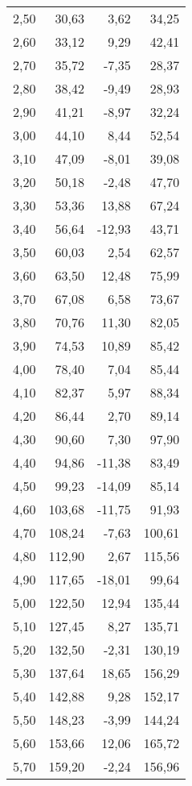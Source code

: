 \documentclass{article}
\begin{document}
\begin{center}
\begin{longtable}{r|r|r|r}
        2,50 & 30,63 & 3,62 & 34,25 \\
        2,60 & 33,12 & 9,29 & 42,41 \\
        2,70 & 35,72 & -7,35 & 28,37 \\
        2,80 & 38,42 & -9,49 & 28,93 \\
        2,90 & 41,21 & -8,97 & 32,24 \\
        3,00 & 44,10 & 8,44 & 52,54 \\
        3,10 & 47,09 & -8,01 & 39,08 \\
        3,20 & 50,18 & -2,48 & 47,70 \\
        3,30 & 53,36 & 13,88 & 67,24 \\
        3,40 & 56,64 & -12,93 & 43,71 \\
        3,50 & 60,03 & 2,54 & 62,57 \\
        3,60 & 63,50 & 12,48 & 75,99 \\
        3,70 & 67,08 & 6,58 & 73,67 \\
        3,80 & 70,76 & 11,30 & 82,05 \\
        3,90 & 74,53 & 10,89 & 85,42 \\
        4,00 & 78,40 & 7,04 & 85,44 \\
        4,10 & 82,37 & 5,97 & 88,34 \\
        4,20 & 86,44 & 2,70 & 89,14 \\
        4,30 & 90,60 & 7,30 & 97,90 \\
        4,40 & 94,86 & -11,38 & 83,49 \\
        4,50 & 99,23 & -14,09 & 85,14 \\
        4,60 & 103,68 & -11,75 & 91,93 \\
        4,70 & 108,24 & -7,63 & 100,61 \\
        4,80 & 112,90 & 2,67 & 115,56 \\
        4,90 & 117,65 & -18,01 & 99,64 \\
        5,00 & 122,50 & 12,94 & 135,44 \\
        5,10 & 127,45 & 8,27 & 135,71 \\
        5,20 & 132,50 & -2,31 & 130,19 \\
        5,30 & 137,64 & 18,65 & 156,29 \\
        5,40 & 142,88 & 9,28 & 152,17 \\
        5,50 & 148,23 & -3,99 & 144,24 \\
        5,60 & 153,66 & 12,06 & 165,72 \\
        5,70 & 159,20 & -2,24 & 156,96 \\

\end{longtable}
\end{center}
\end{document}
